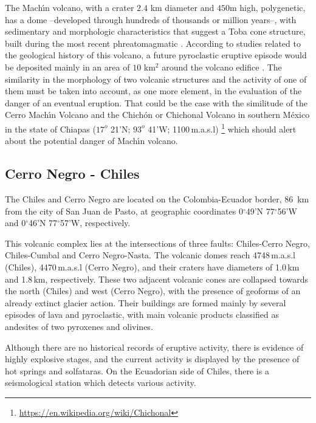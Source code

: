 \documentclass[letterpaper,10pt,titlepage,linenumber]{article}
\begin{document}
The Mach\'{\i}n volcano, with a crater $2.4$ km diameter and $450$m high, polygenetic, has a dome --developed through hundreds of thousands or million years--, with sedimentary and morphologic characteristics that suggest a Toba cone structure, built during the most recent phreatomagmatic \cite{AguilarPiedrahitaENG2017}. According to studies related to the geological history of this volcano, a future pyroclastic eruptive episode would be deposited mainly in an area of $10$ km$^2$ around the volcano edifice \cite{MurciaEtal2010}.
The similarity in the morphology of two volcanic structures and the activity of one of them must be taken into account, as one more element, in the evaluation of the danger of an eventual eruption. That could be the case with the similitude of the Cerro Mach\'{\i}n Volcano and the Chich\'on or Chichonal Volcano in southern M\'exico in the state of Chiapas ($ 17^{o}$ 21'N; $93^{o}$ 41'W; 1100\,m.a.s.l)
\footnote{\url{https://en.wikipedia.org/wiki/Chichonal}} which should alert about the potential danger of Mach\'{\i}n volcano.

\subsection{Cerro Negro - Chiles}
\label{subsec:CerroNegro}
The Chiles and Cerro Negro are located on the Colombia-Ecuador border, 86\, km from the city of San Juan de Pasto, at geographic coordinates 0$^{\circ}$49'N 77$^{\circ}$56'W and 0$^{\circ}$46'N 77$^{\circ}$57'W, respectively. 

This volcanic complex lies at the intersections of three faults: Chiles-Cerro Negro, Chiles-Cumbal and Cerro Negro-Nasta. The volcanic domes reach 4748\,m.a.s.l (Chiles), 4470\,m.a.s.l (Cerro Negro), and their craters have diameters of 1.0\,km and 1.8\,km, respectively. These two adjacent volcanic cones are collapsed towards the north (Chiles) and west (Cerro Negro), with the presence of geoforms of an already extinct glacier action. Their buildings are formed mainly by several episodes of lava and pyroclastic, with main volcanic products classified as andesites of two pyroxenes and olivines. 

Although there are no historical records of eruptive activity, there is evidence of highly explosive stages, and the current activity is displayed by the presence of hot springs and solfataras. On the Ecuadorian side of Chiles, there is a seismological station which detects various activity.
\end{document}
